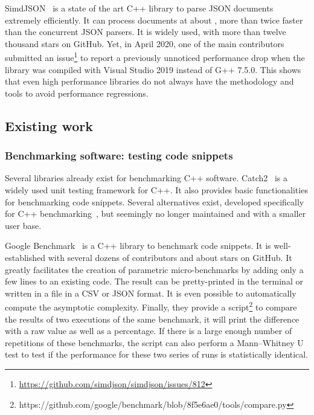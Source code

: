             SimdJSON~\cite{simdjson} is a state of the art C++ library to parse JSON documents extremely efficiently. It
            can process documents at about , more than twice faster than the concurrent
            JSON parsers. It is widely used, with more than twelve thousand stars on GitHub. Yet, in April 2020, one of
            the main contributors submitted an issue\footnote{\url{https://github.com/simdjson/simdjson/issues/812}} to
            report a previously unnoticed  performance drop when the library was compiled with Visual
            Studio 2019 instead of G++ 7.5.0. This shows that even high performance libraries do not always have the
            methodology and tools to avoid performance regressions.

        \subsection{Existing work}%
        \label{sub:existing_work}

            \subsubsection{Benchmarking software: testing code snippets}%

                Several libraries already exist for benchmarking C++ software. Catch2~\cite{catch2} is a widely used
                unit testing framework for C++. It also provides basic functionalities for benchmarking code snippets.
                Several alternatives exist, developed specifically for C++ benchmarking~\cite{celero,hayai,nonius}, but
                seemingly no longer maintained and with a smaller user base.

                Google Benchmark~\cite{google-benchmark} is a C++ library to benchmark code snippets. It is
                well-established with several dozens of contributors and about  stars on GitHub. It greatly
                facilitates the creation of parametric micro-benchmarks by adding only a few lines to an existing code.
                The result can be pretty-printed in the terminal or written in a file in a CSV or JSON format. It is
                even possible to automatically compute the asymptotic complexity. Finally, they provide a
                script\footnote{https://github.com/google/benchmark/blob/8f5e6ae0/tools/compare.py} to compare the
                results of two executions of the same benchmark, it will print the difference with a raw value as well
                as a percentage.  If there is a large enough number of repetitions of these benchmarks, the script can
                also perform a Mann–Whitney U test to test if the performance for these two series of runs is
                statistically identical.

